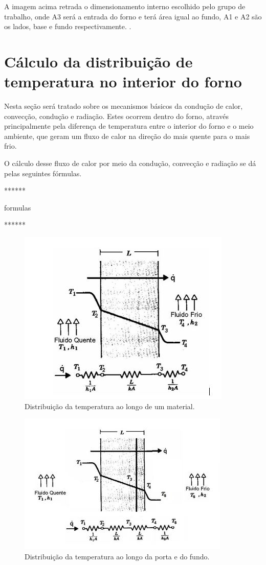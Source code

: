 A imagem acima retrada o dimensionamento interno escolhido pelo grupo de trabalho, onde A3 será a entrada do forno e terá área igual ao fundo, A1 e A2 são os lados, base e fundo respectivamente. . 

\section{Cálculo da distribuição de temperatura no interior do forno}

Nesta seção será tratado sobre os mecanismos básicos da condução de calor, convecção, condução e radiação. Estes ocorrem dentro do forno, através principalmente pela diferença de temperatura entre o interior do forno e o meio ambiente, que geram um fluxo de calor na direção do mais quente para o mais frio.

O cálculo desse fluxo de calor por meio da condução, convecção e radiação se dá pelas seguintes fórmulas.



******

formulas

******


\begin{figure}[H]
	\centering
	\label{dist_temperatura}
	\includegraphics[keepaspectratio=true,scale=0.8]{figuras/dist_temperatura.JPG}
	\caption{Distribuição da temperatura ao longo de um material.}
\end{figure}

\begin{figure}[H]
	\centering
	\label{dist_temperatura}
	\includegraphics[keepaspectratio=true,scale=1.0]{figuras/dist_temperatura2.JPG}
	\caption{Distribuição da temperatura ao longo da porta e do fundo.}
\end{figure}

